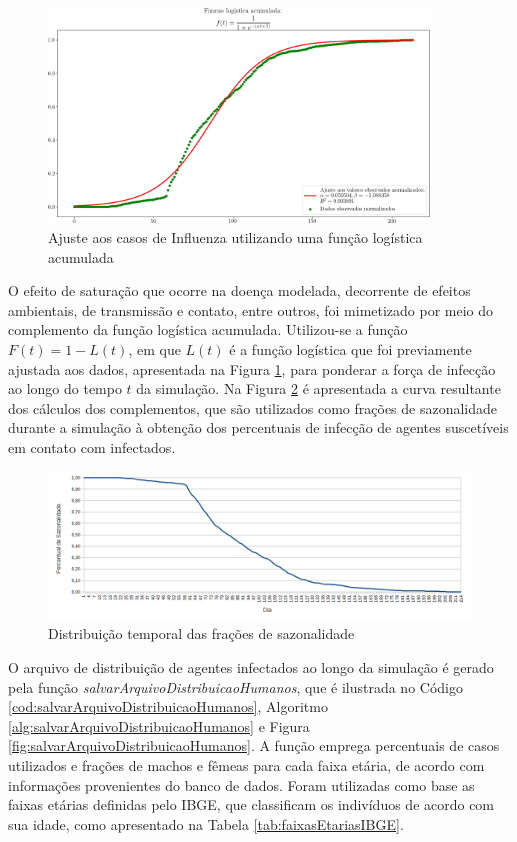 \begin{figure}[H]
  \centering
  \includegraphics[width=0.9\textwidth]{Figuras/Observacoes/Teorico.png}
  \caption{Ajuste aos casos de Influenza utilizando uma função logística acumulada}
  \label{fig:curva_teorica}
\end{figure} 

O efeito de saturação que ocorre na doença modelada, decorrente de efeitos ambientais, de transmissão e contato, entre outros, foi mimetizado por meio do complemento da função logística acumulada. Utilizou-se a função $F(t)=1-L(t)$, em que $L(t)$ é a função logística que foi previamente ajustada aos dados, apresentada na Figura \ref{fig:curva_teorica}, para ponderar a força de infecção ao longo do tempo $t$ da simulação. Na Figura \ref{fig:percentuais_sazonalidade} é apresentada a curva resultante dos cálculos dos complementos, que são utilizados como frações de sazonalidade durante a simulação à obtenção dos percentuais de infecção de agentes suscetíveis em contato com infectados. 

\begin{figure}[H]
  \centering
  \includegraphics[width=1\textwidth]{Figuras/Observacoes/Sazonalidade.png}
  \caption{Distribuição temporal das frações de sazonalidade}
  \label{fig:percentuais_sazonalidade}
\end{figure} 

O arquivo de distribuição de agentes infectados ao longo da simulação é gerado pela função \textit{salvarArquivoDistribuicaoHumanos}, que é ilustrada no Código \ref{cod:salvarArquivoDistribuicaoHumanos}, Algoritmo \ref{alg:salvarArquivoDistribuicaoHumanos} e Figura \ref{fig:salvarArquivoDistribuicaoHumanos}. A função emprega percentuais de casos utilizados e frações de machos e fêmeas para cada faixa etária, de acordo com informações provenientes do banco de dados. Foram utilizadas como base as faixas etárias definidas pelo IBGE, que classificam os indivíduos de acordo com sua idade, como apresentado na Tabela \ref{tab:faixasEtariasIBGE}.  

